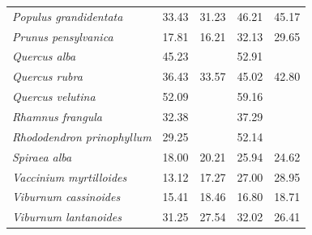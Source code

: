 \documentclass{article}
\begin{document}
\begin{table}[ht]
\begin{tabular}{lrrrr}
  \textit{Populus grandidentata} & 33.43 & 31.23 & 46.21 & 45.17 \\ 
  \textit{Prunus pensylvanica} & 17.81 & 16.21 & 32.13 & 29.65 \\ 
  \textit{Quercus alba} & 45.23 &  & 52.91 &  \\ 
  \textit{Quercus rubra} & 36.43 & 33.57 & 45.02 & 42.80 \\ 
  \textit{Quercus velutina} & 52.09 &  & 59.16 &  \\ 
  \textit{Rhamnus frangula} & 32.38 &  & 37.29 &  \\ 
  \textit{Rhododendron prinophyllum} & 29.25 &  & 52.14 &  \\ 
  \textit{Spiraea alba} & 18.00 & 20.21 & 25.94 & 24.62 \\ 
  \textit{Vaccinium myrtilloides} & 13.12 & 17.27 & 27.00 & 28.95 \\ 
  \textit{Viburnum cassinoides} & 15.41 & 18.46 & 16.80 & 18.71 \\ 
  \textit{Viburnum lantanoides} & 31.25 & 27.54 & 32.02 & 26.41 \\ 
   \hline
\end{tabular}
\end{table}
\clearpage
\newpage
\end{document}
